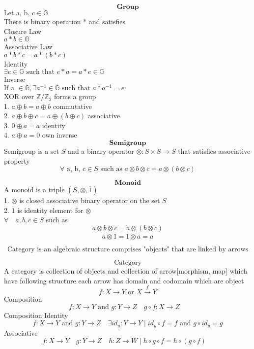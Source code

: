 \documentclass{book}
\begin{document}
\[ \textbf{Group} \]
$\text{Let a, b, c} \in \mathbb{G} $\\
There is binary operation * and satisfies\\

Closure Law\\
$ a*b \in \mathbb{G} $\\

Associative Law\\
$ a*b*c = a*(b*c)$\\

Identity\\
$ \exists \mathit{e} \in \mathbb{G} \text{ such that } \mathit{e}*a = a*\mathit{e} \in \mathbb{G}$\\

Inverse\\
$ \text{If a } \in \mathbb{G}, \exists a^{-1} \in \mathbb{G} \text{ such that } a*a^{-1} = e $\\

XOR over $\mathbb{Z}/\mathbb{Z}_2$ forms a group\\
1. $ a \oplus b = a \oplus b $ commutative\\ 
2. $ a \oplus b \oplus c = a \oplus (b \oplus c) $ associative\\ 
3. $ 0 \oplus a = a $ identity\\ 
4. $ a \oplus a = 0 $ own inverse\\  

\[ \textbf{ Semigroup } \]
Semigroup is a set $S$ and a binary operator $\otimes \colon S \times S \rightarrow S$ that satisfies 
associative property\\ 
\[ \forall \text{ a, b, c} \in S \text{ such as } a \otimes b\otimes c = a \otimes (b \otimes c) \]

\[ \textbf{ Monoid } \]
A monoid is a triple $(S, \otimes, \overline{1})$ \\
1. $\otimes$ is closed associative binary operator on the set $S$ \\
2. $\overline{1}$ is identity element for $\otimes$ \\
$\forall\quad a, b, c \in S$ such as\\
\[ a \otimes b  \otimes c = a \otimes (b \otimes c)   \]
\[ a \otimes \overline{1} = \overline{1} \otimes a =  a  \]

\newpage
\[ \text{Category is an algebraic structure comprises "objects" that are linked by arrows} \] 

\[ \text{ Category } \]
A category is collection of objects and collection of arrow[morphism, map] which have following structure
each arrow has domain and codomain which are object     
\[ f \colon X \rightarrow Y \text{ or } X \xrightarrow{f} Y\]
Composition
\[ f \colon X \rightarrow Y \text{ and } g \colon Y \rightarrow Z \quad g \circ f \colon X \rightarrow Z \quad \]
Composition Identity
\[ f \colon X \rightarrow Y \text{ and } g \colon Y \rightarrow Z  \quad \exists id_y \colon Y \rightarrow Y \mid id_y \circ f = f \text{ and } g \circ id_y = g \]
Associative
\[ f \colon X \rightarrow Y \quad g \colon Y \rightarrow Z \quad h \colon Z \rightarrow W \mid h \circ g \circ f = h \circ (g \circ f) \quad \]
\end{document}
